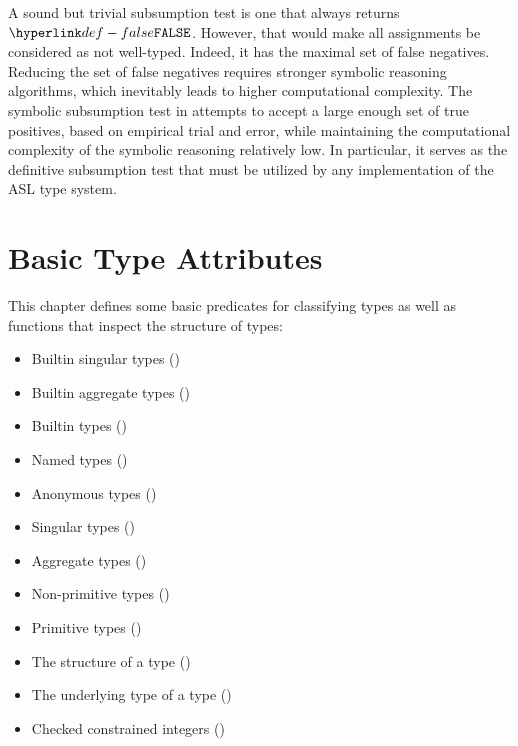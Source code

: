 A sound but trivial subsumption test is one that always returns $\False$.
However, that would make all assignments be considered as not well-typed.
Indeed, it has the maximal set of false negatives.
Reducing the set of false negatives requires stronger symbolic reasoning algorithms,
which inevitably leads to higher computational complexity.
%
The symbolic subsumption test in 
attempts to accept a large enough set of true positives, based on empirical trial and error,
while maintaining the computational complexity of the symbolic reasoning relatively low.
%
In particular, it serves as the definitive subsumption test that must be utilized
by any implementation of the ASL type system.

\chapter{Basic Type Attributes}

This chapter defines some basic predicates for classifying types as well as
functions that inspect the structure of types:
\begin{itemize}
  \item Builtin singular types ()
  \item Builtin aggregate types ()
  \item Builtin types ()
  \item Named types ()
  \item Anonymous types ()
  \item Singular types ()
  \item Aggregate types ()
  \item Non-primitive types ()
  \item Primitive types ()
  \item The structure of a type ()
  \item The underlying type of a type ()
  \item Checked constrained integers ()
\end{itemize}

